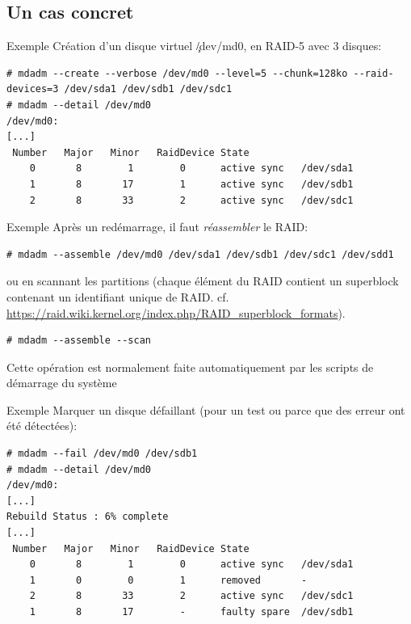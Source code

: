 \subsection{Un cas concret}

\begin{frame}[fragile=singleslide]{Exemple}
  Création d'un disque virtuel \c{/dev/md0}, en RAID-5 avec 3 disques:
  \begin{lstlisting}
# mdadm --create --verbose /dev/md0 --level=5 --chunk=128ko --raid-devices=3 /dev/sda1 /dev/sdb1 /dev/sdc1
# mdadm --detail /dev/md0
/dev/md0:
[...]
 Number   Major   Minor   RaidDevice State
    0       8        1        0      active sync   /dev/sda1
    1       8       17        1      active sync   /dev/sdb1
    2       8       33        2      active sync   /dev/sdc1
  \end{lstlisting}
\end{frame}

\begin{frame}[fragile=singleslide]{Exemple}
  Après un redémarrage, il faut \emph{réassembler} le RAID:
  \begin{lstlisting}
# mdadm --assemble /dev/md0 /dev/sda1 /dev/sdb1 /dev/sdc1 /dev/sdd1
  \end{lstlisting}
  ou  en scannant  les partitions  (chaque élément  du RAID  contient un
  superblock      contenant     un      identifiant      unique     de
  RAID. cf. \url{https://raid.wiki.kernel.org/index.php/RAID_superblock_formats}).
  \begin{lstlisting}
# mdadm --assemble --scan
  \end{lstlisting}
  Cette  opération  est  normalement  faite  automatiquement  par  les
  scripts de démarrage du système
\end{frame}

\begin{frame}[fragile=singleslide]{Exemple}
  Marquer un disque  défaillant (pour un test ou  parce que des erreur
  ont été détectées):
  \begin{lstlisting}
# mdadm --fail /dev/md0 /dev/sdb1
# mdadm --detail /dev/md0
/dev/md0:
[...]
Rebuild Status : 6% complete
[...]
 Number   Major   Minor   RaidDevice State
    0       8        1        0      active sync   /dev/sda1
    1       0        0        1      removed       -
    2       8       33        2      active sync   /dev/sdc1
    1       8       17        -      faulty spare  /dev/sdb1
  \end{lstlisting}
\end{frame}


